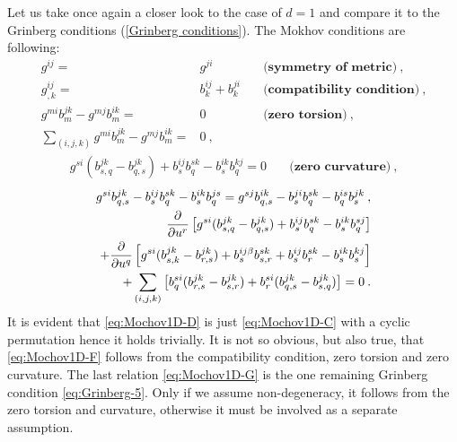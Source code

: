 \begin{remark}
    Let us take once again a closer look to the case of $d=1$ and compare it to the Grinberg conditions (\vref{Grinberg conditions}). The Mokhov conditions are following:
    \begin{align}
        g^{ij} =& g^{ji} \quad &\textbf{(symmetry of metric)} \:, \label{eq:Mochov1D-A}\\
        g^{ij}_{,k} =& b^{ij}_k + b^{ji}_k \quad &\textbf{(compatibility condition)} \label{eq:Mochov1D-B}\:, \\
        g^{mi} b^{jk}_m - g^{mj} b^{ik}_m =& 0 \quad &\textbf{(zero torsion)} \:, \label{eq:Mochov1D-C}\\
        \sum_{(i,j,k)} g^{mi} b^{jk}_m - g^{mj} b^{ik}_m =& 0 \:,\quad& \label{eq:Mochov1D-D}
    \end{align}
    \begin{align}
        g^{si} (b^{jk}_{s,q} - b^{jk}_{q,s}) + b^{ij}_s b^{sk}_q - b^{ik}_s b^{kj}_q = 0 \quad &\textbf{(zero curvature)}\:, \label{eq:Mochov1D-E}
    \end{align}
    \begin{align}
        g^{si} b^{j k}_{q,s} - b^{ij}_s b^{s k}_q - b^{i k}_s b^{j s}_q = g^{s j } b^{i k}_{q,s} - b^{ji}_s b^{s k}_q - b^{is}_q b^{jk}_s \:, \label{eq:Mochov1D-F}\\
        \frac{\partial }{\partial u^r} \left[ g^{si} (b^{j k }_{s,q} - b^{j k}_{q,s}) + b^{ij}_s b^{s k}_q - b^{i k}_s b^{s j}_q \right] 
        \nonumber \\+ \frac{\partial }{\partial u^q} \left[ g^{si } (b^{j k}_{s,k} - b^{j k}_{r,s}) + b^{ij \beta}_s b^{s k}_{s,r} + b^{ij}_s b^{s k}_r - b^{ik}_s b^{kj}_s \right] \label{eq:Mochov1D-G}
        \\+ \sum_{(i,j,k)} \left[ b^{si}_q (b^{j k}_{r,s} - b^{j k}_{s,r}) + b^{s i}_r (b^{j k}_{q,s} - b^{j k}_{s,q}) \right] \nonumber
        = 0 \:.
    \end{align}
    It is evident that \eqref{eq:Mochov1D-D} is just \eqref{eq:Mochov1D-C} with a cyclic permutation hence it holds trivially. It is not so obvious, but also true, that \eqref{eq:Mochov1D-F} follows from the compatibility condition, zero torsion and zero curvature. 
     The last relation \eqref{eq:Mochov1D-G} is the one remaining Grinberg condition \eqref{eq:Grinberg-5}. Only if we assume non-degeneracy, it follows from the zero torsion and curvature, otherwise it must be involved as a separate assumption.
\end{remark}

